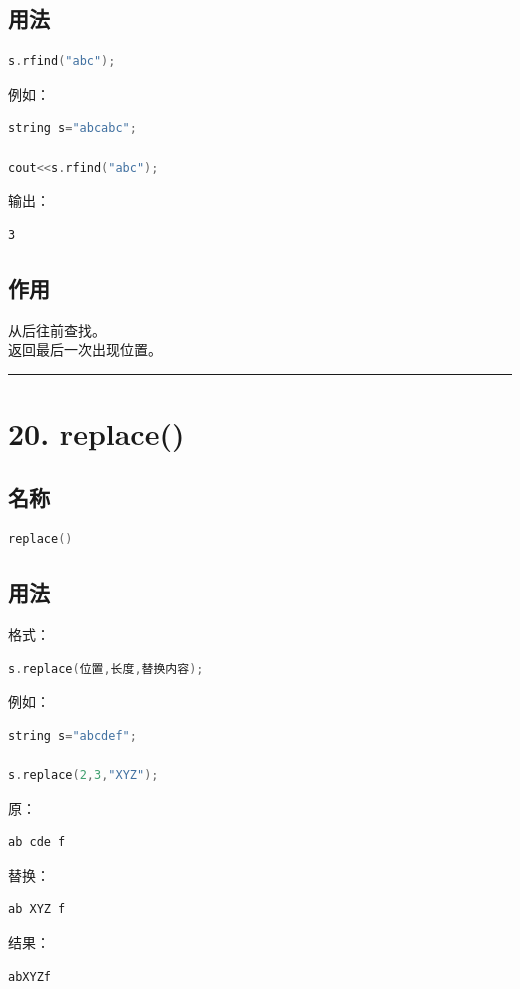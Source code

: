\documentclass[9pt,twocolumn]{extarticle}
\begin{document}
\subsection{用法}
\begin{lstlisting}[language=C++]
s.rfind("abc");
\end{lstlisting}
例如：
\begin{lstlisting}[language=C++]
string s="abcabc";

cout<<s.rfind("abc");
\end{lstlisting}
输出：
\begin{lstlisting}
3
\end{lstlisting}

\subsection{作用}
从后往前查找。\\
返回最后一次出现位置。

\noindent\rule{\linewidth}{0.4pt}

\section{20. replace()}

\subsection{名称}
\begin{lstlisting}[language=C++]
replace()
\end{lstlisting}

\subsection{用法}
格式：
\begin{lstlisting}[language=C++]
s.replace(位置,长度,替换内容);
\end{lstlisting}
例如：
\begin{lstlisting}[language=C++]
string s="abcdef";

s.replace(2,3,"XYZ");
\end{lstlisting}
原：
\begin{lstlisting}
ab cde f
\end{lstlisting}
替换：
\begin{lstlisting}
ab XYZ f
\end{lstlisting}
结果：
\begin{lstlisting}
abXYZf
\end{lstlisting}
\end{document}
